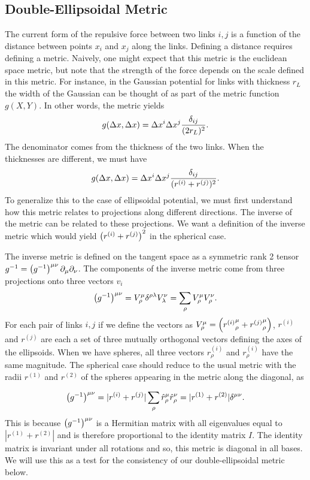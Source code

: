 \documentclass[endfloats,nofootinbib,preprint,floatfix,titlepage,superscriptaddress]{revtex4} %
\begin{document}
\subsection{Double-Ellipsoidal Metric }
The current form of the repulsive force between two links $i,j$ is a function of the distance between points $x_i$ and $x_j$ along the links. 
Defining a distance requires defining a metric. 
Naively, one might expect that this metric is the euclidean space metric, but note that the strength of the force depends on the scale defined in this metric. 
For instance, in the Gaussian potential for links with thickness $r_L$ the width of the Gaussian can be thought of as part of the metric function $g(X,Y)$. 
In other words, the metric yields
\[g(\Delta x, \Delta x) = \Delta x^i \Delta x^j {\delta_{ij} \over (2 r_L)^2}.  \]
The denominator comes from the thickness of the two links. When the thicknesses are different, we must have
\[g(\Delta x, \Delta x) = \Delta x^i \Delta x^j {\delta_{ij} \over ( r^{(i)} +r^{(j)})^2}.  \]
To generalize this to the case of ellipsoidal potential, we must first understand how this metric relates to projections along different directions. 
The inverse of the metric can be related to these projections. 
We want a definition of the inverse metric which would yield $\left(r^{(i)} +r^{(j)}\right)^2$ in the spherical case. 

The inverse metric is defined on the tangent space as a symmetric rank 2 tensor $ g^{-1} = \left(g^{-1}\right)^{\mu\nu}\partial_\mu \partial_\nu $. 
The components of the inverse metric  come from three projections onto three vectors $v_i$
\begin{equation}
    \left(g^{-1}\right)^{\mu\nu} = V^\mu_\rho \delta^{\rho \lambda} V^\nu_\lambda =  \sum_{\rho} V_\rho^\mu V_\rho^\nu. \label{eq:ginv}
\end{equation}
For each pair of links $i,j$ if we define the vectors as $V_\rho^\mu =%
\pr{{r^{(i)}}_{\rho}^\mu+{r^{(j)}}_{\rho}^\mu} $, 
$r^{(i)}$ and $r^{(j)}$ are each a set of three mutually orthogonal vectors defining the axes of the ellipsoids. 
When we have spheres, all three vectors $r^{(i)}_\rho$ and $r^{(i)}_\rho$ have the same magnitude. 
The spherical case should reduce to the usual metric with the radii $r^{(1)}$ and $r^{(2)}$ of the spheres appearing in the metric along the diagonal, as 

$$ \left(g^{-1}\right)^{\mu\nu} = |r^{(i)}+r^{(j)}|\sum_{\rho} \hat{r}_\rho^\mu \hat{r}_\rho^\nu = |r^{(1)}+r^{(2)}| \delta^{\mu\nu }.$$
This is because $ \left(g^{-1}\right)^{\mu\nu} $ is a Hermitian matrix with all eigenvalues equal to $|r^{(1)}+r^{(2)}|$ and is therefore proportional to the identity matrix $I$. The identity matrix is invariant under all rotations and so, this metric is diagonal in all bases.
We will use this as a test for the consistency of our double-ellipsoidal metric below. 
 
\end{document}
